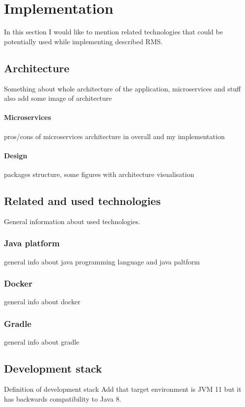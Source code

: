 
\chapter{Implementation}\label{ch:used-technologies}
In this section I would like to mention related technologies that could be potentially used while implementing described RMS\@.

\section{Architecture}
Something about whole architecture of the application, microservices and stuff
also add some image of architecture
\subsubsection{Microservices}
pros/cons of microservices architecture in overall and my implementation

\subsubsection{Design}
packages structure, some figures with architecture visualisation

\section{Related and used technologies}\label{sec:related-technologies}
General information about used technologies.

\subsection{Java platform}\label{subsec:tech-java}
general info about java programming language and java paltform

\subsection{Docker}\label{subsec:tech-docker}
general info about docker 

\subsection{Gradle}\label{subsec:tech-gradle}
general info about gradle

\section{Development stack}\label{sec:development-stack}
Definition of development stack
Add that target environment is JVM 11 but it has backwards compatibility to Java 8.

